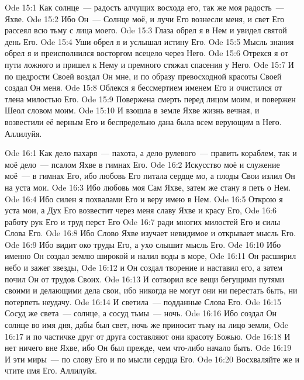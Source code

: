 \vs Ode 15:1
Как солнце~---
радость алчущих восхода его, так же моя радость~--- Яхве.
\vs Ode 15:2
Ибо Он~---
Солнце моё, и лучи Его вознесли меня, и свет Его рассеял всю тьму с лица моего.
\vs Ode 15:3
Глаза обрел я
в Нем и увидел святой день Его.
\vs Ode 15:4
Уши обрел я и
услышал истину Его.
\vs Ode 15:5
Мысль знания
обрел я и преисполнился восторгом всецело через Него.
\vs Ode 15:6
Отрекся я от
пути ложного и пришел к Нему и премного стяжал спасения у Него.
\vs Ode 15:7
И по щедрости
Своей воздал Он мне, и по образу превосходной красоты Своей создал Он меня.
\vs Ode 15:8
Облекся я
бессмертием именем Его и очистился от тлена милостью Его.
\vs Ode 15:9
Повержена
смерть перед лицом моим, и повержен Шеол словом моим.
\vs Ode 15:10
И взошла в
земле Яхве жизнь вечная, и возвестили её верным Его и беспредельно дана была
всем верующим в Него.
Аллилуйя.

\vs Ode 16:1
Как дело
пахаря~--- пахота, а дело рулевого~--- править кораблем, так и моё дело~--- псалом
Яхве в гимнах Его.
\vs Ode 16:2
Искусство моё
и служение моё~--- в гимнах Его, ибо любовь Его питала сердце мо, а плоды Свои
излил Он на уста мои.
\vs Ode 16:3
Ибо любовь моя
Сам Яхве, затем же стану я петь о Нем.
\vs Ode 16:4
Ибо силен я
похвалами Его и веру имею в Нем.
\vs Ode 16:5
Открою я уста
мои, а Дух Его возвестит через меня славу Яхве и красу Его,
\vs Ode 16:6
работу рук Его
и труд перст Его
\vs Ode 16:7
ради многих
милостей Его и силы Слова Его.
\vs Ode 16:8
Ибо Слово Яхве
изучает невидимое и открывает мысль Его.
\vs Ode 16:9
Ибо видит око
труды Его, а ухо слышит мысль Его.
\vs Ode 16:10
Ибо именно Он
создал землю широкой и налил воды в море,
\vs Ode 16:11
Он расширил
небо и зажег звезды,
\vs Ode 16:12
и Он создал
творение и наставил его, а затем почил Он от трудов Своих.
\vs Ode 16:13
И сотворил
все вещи бегущими путями своими и делающими дела свои, ибо никогда не могут они
ни перестать быть, ни потерпеть неудачу.
\vs Ode 16:14
И светила~---
подданные Слова Его.
\vs Ode 16:15
Сосуд же
света~--- солнце, а сосуд тьмы~--- ночь.
\vs Ode 16:16
Ибо создал Он
солнце во имя дня, дабы был свет, ночь же приносит тьму на лицо земли,
\vs Ode 16:17
и по частичке
друг от друга составляют они красоту Божью.
\vs Ode 16:18
И нет ничего
вне Яхве, ибо Он был прежде, чем что-либо начало быть.
\vs Ode 16:19
И эти миры~---
по слову Его и по мысли сердца Его.
\vs Ode 16:20
Восхваляйте
же и чтите имя Его.
Аллилуйя.

